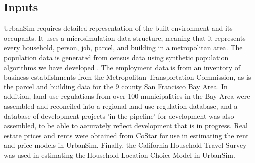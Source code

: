 




\subsection{Inputs}

UrbanSim requires detailed representation of the built environment and its occupants.  It uses a microsimulation data structure, meaning that it represents every household, person, job, parcel, and building in a metropolitan area. The population data is generated from census data using synthetic population algorithms we have developed \citep{ye-trb-2009}.  The employment data is from an inventory of business establishments from the Metropolitan Transportation Commission, as is the parcel and building data for the 9 county San Francisco Bay Area. In addition, land use regulations from over 100 municipalities in the Bay Area were assembled and reconciled into a regional land use regulation database, and a database of development projects 'in the pipeline' for development was also assembled, to be able to accurately reflect development that is in progress.  Real estate prices and rents were obtained from CoStar for use in estimating the rent and price models in UrbanSim.  Finally, the California Household Travel Survey was used in estimating the Household Location Choice Model in UrbanSim.


